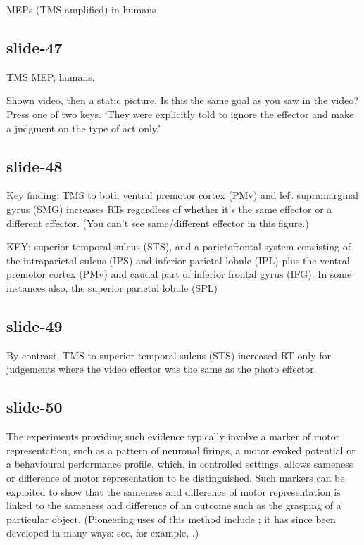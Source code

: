 \documentclass[12pt,\papersize]{extarticle}
\begin{document}
MEPs (TMS amplified) in humans

\subsection{slide-47}
TMS MEP, humans.

Shown video, then a static picture.
Is this the same goal as you saw in the video?
Press one of two keys.
‘They were explicitly told to ignore the effector and make a judgment on the type of act only.’

\subsection{slide-48}
Key finding: TMS to both ventral premotor cortex (PMv) and left supramarginal gyrus (SMG)
increases RTs regardless of whether it’s the same effector or a different effector.
(You can’t see same/different effector in this figure.)

KEY: superior temporal sulcus (STS), and a parietofrontal system consisting of the intraparietal
sulcus (IPS) and inferior parietal lobule (IPL) plus the ventral premotor cortex (PMv) and caudal
part of inferior frontal gyrus (IFG). In some instances also, the superior parietal lobule (SPL)

\subsection{slide-49}
By contrast, TMS to superior temporal sulcus (STS) increased RT only for judgements
where the video effector was the same as the photo effector.

\subsection{slide-50}
The experiments providing such evidence typically involve a marker of motor representation,
such as a pattern of neuronal firings, a motor evoked potential or a behavioural performance
profile, which, in controlled settings, allows sameness or difference of motor representation
to be distinguished.  Such markers can be exploited to show that the sameness and difference
of motor representation is linked to the sameness and difference of an outcome such as the
grasping of a particular object.
(Pioneering uses of this method include \citealp{rizzolatti:1988_functional,Rizzolatti:2001ug};
it has since been developed in many ways: see, for example,
\citet{hamilton:2008_action, cattaneo:2009_representation, cattaneo:2010_state-dependent,
rochat:2010_responses, bonini:2010_ventral, koch:2010_resonance}.)
\end{document}
